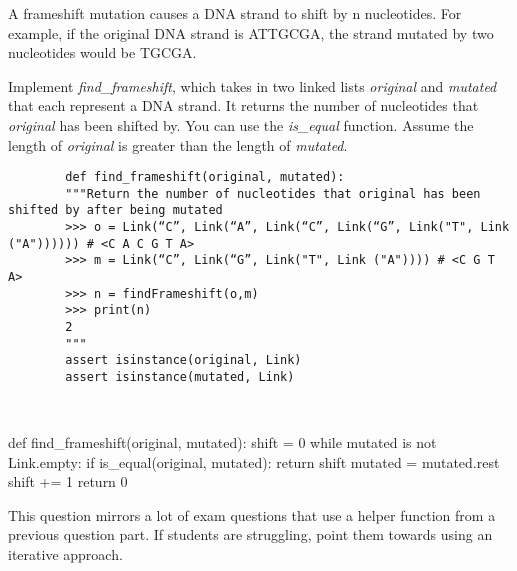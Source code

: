 

\begin{blocksection}
    \question A frameshift mutation causes a DNA strand to shift by n nucleotides. For example, if the original DNA strand is ATTGCGA, the strand mutated by two nucleotides would be TGCGA. 
    
    
    Implement \textit{find\_frameshift}, which takes in two linked lists \textit{original} and \textit{mutated} that each represent a DNA strand. It returns the number of nucleotides that \textit{original} has been shifted by. You can use the \textit{is\_equal} function. Assume the length of \textit{original} is greater than the length of \textit{mutated}. 

    
    
    \begin{lstlisting}
        def find_frameshift(original, mutated):
        """Return the number of nucleotides that original has been shifted by after being mutated
        >>> o = Link(“C”, Link(“A”, Link(“C”, Link(“G”, Link("T", Link ("A")))))) # <C A C G T A>
        >>> m = Link(“C”, Link(“G”, Link("T", Link ("A")))) # <C G T A>
        >>> n = findFrameshift(o,m)
        >>> print(n)
        2
        """
        assert isinstance(original, Link)
        assert isinstance(mutated, Link)
        	
        
    \end{lstlisting}
    
    \begin{solution}
        def find_frameshift(original, mutated):
            shift = 0
            while mutated is not Link.empty:
                if is_equal(original, mutated):
                    return shift
                mutated = mutated.rest
                shift += 1
            return 0

    \end{solution}
    \end{blocksection}
    
    \begin{questionmeta}
        This question mirrors a lot of exam questions that use a helper function from a previous question part. If students are struggling, point them towards using an iterative approach. 
    \end{questionmeta}
    